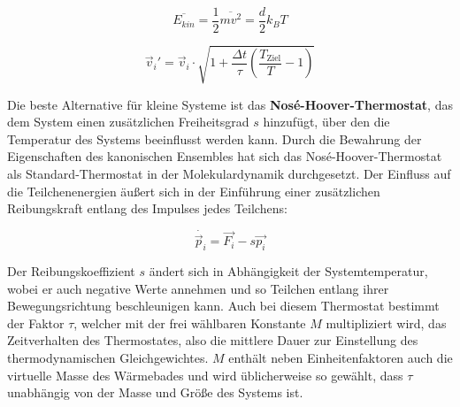 \begin{equation}
  \overline{E_{kin}} = \frac{1}{2} \overline{m v^2} = \frac{d}{2} k_B T
  \label{eq:ekanonisch}
\end{equation}

\begin{equation}
  \vec v_i' = \vec v_i \cdot \sqrt{1 + \frac{\Delta t}{\tau} \left(\frac{T_\text{Ziel}}{T} - 1\right)}
  \label{eq:berendsen}
\end{equation}


Die beste Alternative für kleine Systeme ist das \textbf{Nosé-Hoover-Thermostat}\cite{nose_unified_1984}\cite{hoover_canonical_1985}, das dem System einen zusätzlichen Freiheitsgrad $s$ hinzufügt, über den die Temperatur des Systems beeinflusst werden kann.
Durch die Bewahrung der Eigenschaften des kanonischen Ensembles hat sich das Nosé-Hoover-Thermostat als Standard-Thermostat in der Molekulardynamik durchgesetzt.
Der Einfluss auf die Teilchenenergien äußert sich in der Einführung einer zusätzlichen Reibungskraft entlang des Impulses jedes Teilchens:

\begin{equation}
  \dot{\vec p_i} = \vec{F_i} - s \vec{p_i}
\end{equation}

Der Reibungskoeffizient $s$ ändert sich in Abhängigkeit der Systemtemperatur, wobei er auch negative Werte annehmen und so Teilchen entlang ihrer Bewegungsrichtung beschleunigen kann.
Auch bei diesem Thermostat bestimmt der Faktor $\tau$, welcher mit der frei wählbaren Konstante $M$ multipliziert wird, das Zeitverhalten des Thermostates, also die mittlere Dauer zur Einstellung des thermodynamischen Gleichgewichtes.
$M$ enthält neben Einheitenfaktoren auch die virtuelle Masse des Wärmebades und wird üblicherweise so gewählt, dass $\tau$ unabhängig von der Masse und Größe des Systems ist.

